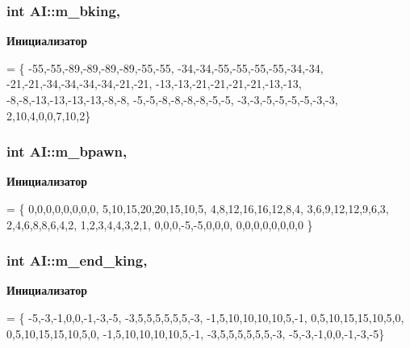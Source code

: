 \subsubsection[{m\+\_\+bking}]{\setlength{\rightskip}{0pt plus 5cm}int A\+I\+::m\+\_\+bking\hspace{0.3cm}{\ttfamily [static]}, {\ttfamily [protected]}}\label{class_a_i_a816338121fb591918d66bdefb4cda805}
{\bfseries Инициализатор}
\begin{DoxyCode}
= \{
    -55,-55,-89,-89,-89,-89,-55,-55,
    -34,-34,-55,-55,-55,-55,-34,-34,
    -21,-21,-34,-34,-34,-34,-21,-21,
    -13,-13,-21,-21,-21,-21,-13,-13,
    -8,-8,-13,-13,-13,-13,-8,-8,
    -5,-5,-8,-8,-8,-8,-5,-5,
    -3,-3,-5,-5,-5,-5,-3,-3,
    2,10,4,0,0,7,10,2\}
\end{DoxyCode}
\hypertarget{class_a_i_aed628e02e8d5bdc970bfb01acd6162f2}{}
\subsubsection[{m\+\_\+bpawn}]{\setlength{\rightskip}{0pt plus 5cm}int A\+I\+::m\+\_\+bpawn\hspace{0.3cm}{\ttfamily [static]}, {\ttfamily [protected]}}\label{class_a_i_aed628e02e8d5bdc970bfb01acd6162f2}
{\bfseries Инициализатор}
\begin{DoxyCode}
= \{
    0,0,0,0,0,0,0,0,
    5,10,15,20,20,15,10,5,
    4,8,12,16,16,12,8,4,
    3,6,9,12,12,9,6,3,
    2,4,6,8,8,6,4,2,
    1,2,3,4,4,3,2,1,
    0,0,0,-5,-5,0,0,0,
    0,0,0,0,0,0,0,0 \}
\end{DoxyCode}
\hypertarget{class_a_i_aa578831d72d1539297b700dd5c6b37d6}{}
\subsubsection[{m\+\_\+end\+\_\+king}]{\setlength{\rightskip}{0pt plus 5cm}int A\+I\+::m\+\_\+end\+\_\+king\hspace{0.3cm}{\ttfamily [static]}, {\ttfamily [protected]}}\label{class_a_i_aa578831d72d1539297b700dd5c6b37d6}
{\bfseries Инициализатор}
\begin{DoxyCode}
= \{
    -5,-3,-1,0,0,-1,-3,-5,
    -3,5,5,5,5,5,5,-3,
    -1,5,10,10,10,10,5,-1,
    0,5,10,15,15,10,5,0,
    0,5,10,15,15,10,5,0,
    -1,5,10,10,10,10,5,-1,
    -3,5,5,5,5,5,5,-3,
    -5,-3,-1,0,0,-1,-3,-5\}
\end{DoxyCode}
\hypertarget{class_a_i_adbe96956dc1a50f47c828c04072cecfe}{}
